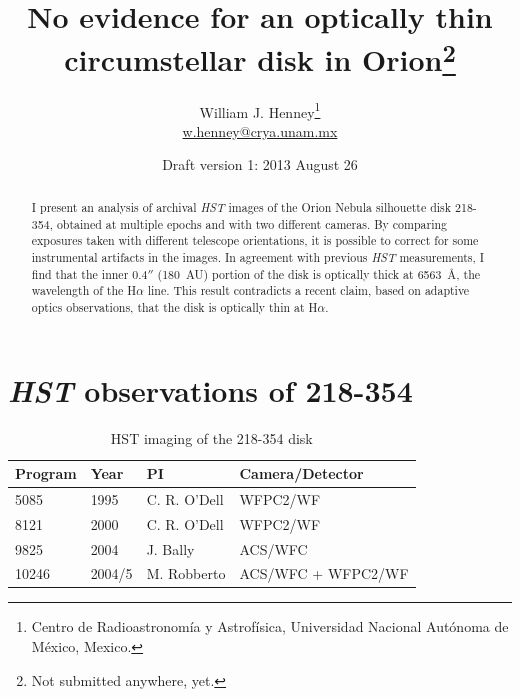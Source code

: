 \documentclass[oneside, 11pt]{article}
\title{No evidence for an optically thin circumstellar disk in Orion\thanks{Not submitted anywhere, yet.}}
\author{William J. Henney\thanks{
    Centro de Radioastronomía y Astrofísica, 
    Universidad Nacional Autónoma de México, Mexico.  
  }\\
  \protect\footnotesize\url{w.henney@crya.unam.mx}
  }
\date{Draft version 1: 2013 August 26}
\begin{document}
\maketitle

\begin{abstract}
  I present an analysis of archival \textit{HST} images of  the Orion Nebula silhouette disk 218-354, obtained at multiple epochs and with two different cameras.   By comparing exposures taken with different telescope orientations, it is possible to correct for some instrumental artifacts in the images.   In agreement with previous \textit{HST} measurements, I find that the inner \(0.4''\) (180~AU) portion of the disk is optically thick at 6563~\AA{}, the wavelength of  the H\(\alpha\) line.   This result contradicts a recent claim, based on adaptive optics observations, that the disk is optically thin at H\(\alpha\).

\end{abstract}

\clearpage
\section{\textit{HST} observations of 218-354}
\label{sec:hst}


\begin{table}
  \caption{HST imaging of the 218-354 disk}
  \label{tab:hst}
  \centering
  \smallskip
  \begin{tabular}{llll}\toprule
  Program & Year & PI & Camera/Detector \\ \midrule
  5085 & 1995 & C. R. O'Dell & WFPC2/WF \\
  8121 & 2000 & C. R. O'Dell & WFPC2/WF \\
  9825 & 2004 & J. Bally & ACS/WFC \\
  10246 & 2004/5 & M. Robberto & ACS/WFC + WFPC2/WF\\ \bottomrule
\end{tabular}
\end{table}
\end{document}
